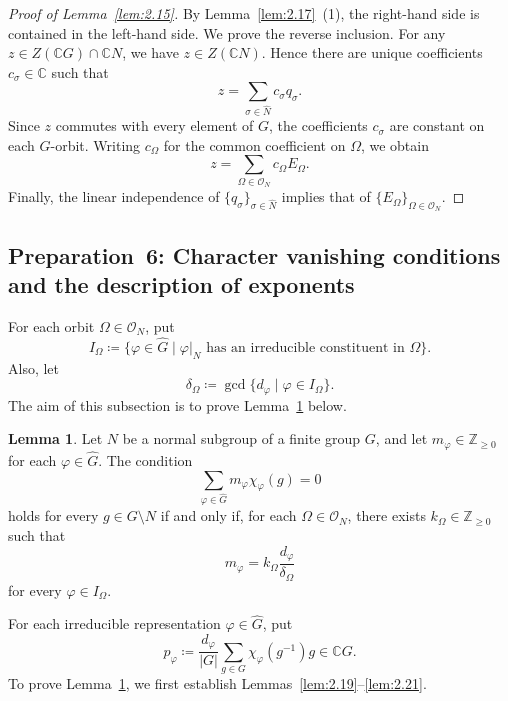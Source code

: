 \documentclass[12pt,a4paper]{article}
\theoremstyle{definition}
\newtheorem{lem}[definition]{Lemma}
\numberwithin{definition}{section}
\begin{document}
\begin{proof}[Proof of Lemma~\ref{lem:2.15}]
By Lemma~\ref{lem:2.17}~(1), the right-hand side is contained in the left-hand side.
We prove the reverse inclusion.
For any $z \in Z(\mathbb{C}G) \cap \mathbb{C}N$, we have $z \in Z(\mathbb{C}N)$.
Hence there are unique coefficients $c_{\sigma} \in \mathbb{C}$ such that
\[
z = \sum_{\sigma \in \widehat{N}} c_{\sigma} q_{\sigma}.
\]
Since $z$ commutes with every element of $G$, the coefficients $c_{\sigma}$ are constant on each $G$-orbit.
Writing $c_{\Omega}$ for the common coefficient on $\Omega$, we obtain
\[
z = \sum_{\Omega \in \mathcal{O}_{N}} c_{\Omega} E_{\Omega}.
\]
Finally, the linear independence of $\{ q_{\sigma} \}_{\sigma \in \widehat{N}}$
implies that of $\{ E_{\Omega} \}_{\Omega \in \mathcal{O}_{N}}$.
\end{proof}

\subsection{Preparation~6: Character vanishing conditions and the description of exponents}\label{sec:2.6}

For each orbit $\Omega \in \mathcal{O}_{N}$, put
\[
I_{\Omega} \coloneqq \{ \varphi \in \widehat{G} \mid \varphi|_{N} \text{ has an irreducible constituent in } \Omega \}.
\]
Also, let
\[
\delta_{\Omega} \coloneqq \gcd{\{ d_{\varphi} \mid \varphi \in I_{\Omega} \}}.
\]
The aim of this subsection is to prove Lemma~\ref{lem:2.18} below.

\begin{lem}\label{lem:2.18}
Let $N$ be a normal subgroup of a finite group $G$, and let
$m_\varphi\in\mathbb Z_{\geq0}$ for each $\varphi\in\widehat G$.
The condition
\[
\sum_{\varphi \in \widehat{G}} m_{\varphi} \chi_{\varphi}(g) = 0
\]
holds for every $g \in G \setminus N$ if and only if,
for each $\Omega \in \mathcal{O}_{N}$, there exists $k_{\Omega} \in \mathbb{Z}_{\geq 0}$ such that
\[
m_{\varphi} = k_{\Omega} \dfrac{d_{\varphi}}{\delta_{\Omega}}
\]
for every $\varphi \in I_{\Omega}$.
\end{lem}

For each irreducible representation $\varphi \in \widehat{G}$, put
\[
p_{\varphi} \coloneqq \dfrac{d_{\varphi}}{|G|} \sum_{g \in G} \chi_{\varphi}(g^{-1}) g \in \mathbb{C}G.
\]
To prove Lemma~\ref{lem:2.18}, we first establish Lemmas~\ref{lem:2.19}--\ref{lem:2.21}.
\end{document}
